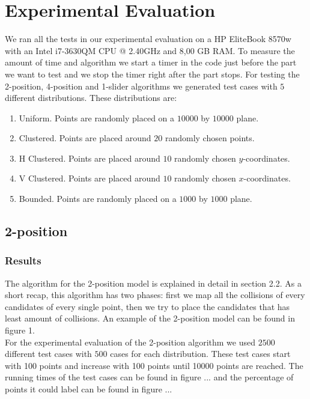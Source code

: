 \documentclass[crop=false,a4paper,oneside,11pt]{standalone}
\begin{document}
\section{Experimental Evaluation}

We ran all the tests in our experimental evaluation on a HP EliteBook 8570w with an Intel i7-3630QM CPU @ 2.40GHz and 8,00 GB RAM. To measure the amount of time and algorithm we start a timer in the code just before the part we want to test and we stop the timer right after the part stops. For testing the 2-position, 4-position and 1-slider algorithms we generated test cases with $5$ different distributions. These distributions are:
\begin{enumerate}
    \item Uniform. Points are randomly placed on a $10000$ by $10000$ plane.
    \item Clustered. Points are placed around $20$ randomly chosen points.
    \item H Clustered. Points are placed around $10$ randomly chosen $y$-coordinates.
    \item V Clustered. Points are placed around $10$ randomly chosen $x$-coordinates.
    \item Bounded. Points are randomly placed on a $1000$ by $1000$ plane.
\end{enumerate}

\subsection{2-position}
\subsubsection{Results}
The algorithm for the 2-position model is explained in detail in section 2.2. As a short recap, this algorithm has two phases: first we map all the collisions of every candidates of every single point, then we try to place the candidates that has least amount of collisions. An example of the 2-position model can be found in figure 1.\\
For the experimental evaluation of the 2-position algorithm we used $2500$ different test cases with $500$ cases for each distribution. These test cases start with 100 points and increase with 100 points until 10000 points are reached. The running times of the test cases can be found in figure ... and the percentage of points it could label can be found in figure ...\\
\end{document}
